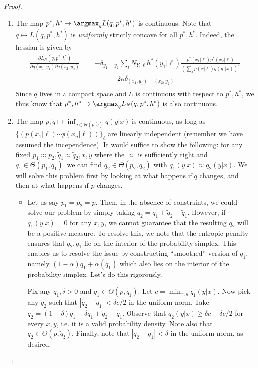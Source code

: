 \begin{proof}
\begin{enumerate}
\item The map $p^*,h^* \mapsto \argmax_q L(q,p^*,h^*)$ is continuous.  Note that $q\mapsto L(q,p^*,h^*)$
is \emph{uniformly} strictly concave for all $p^*,h^*$.  Indeed, the hessian is given by
%
\begin{align*}
\frac{\partial L_N(q,p^*,h^*)}{\partial q(x_1,y_1) \partial q(x_2,y_2)} =& 
    - \delta_{y_1=y_2}\sum_\ell N_{Y,\ell} h^*(y_1|\ell) 
              \frac{p^*(x_1|\ell)p^*(x_2|\ell)}{\left(\sum_x p(x|\ell) q(y_1|x)\right)^2} \\
    & \qquad - 2\kappa \delta_{(x_1,y_1)=(x_2,y_2)} \\
\end{align*}
%
Since $q$ lives in a compact space and $L$ is continuous with respect to $p^*,h^*$, we thus 
know that $p^*,h^* \mapsto \argmax_q L_N(q,p^*,h^*)$ is also continuous.  
\item The map $p,\tilde q \mapsto \inf_{q\in\Theta(p,\tilde q)} q(y|x)$ is continuous, as long as 
$\{(p(x_1|\ell)\cdots p(x_n|\ell))\}_\ell$ are linearly independent (remember we have assumed the independence). 
It would suffice to show the following: 
for any fixed $p_1 \approx p_2,\tilde q_1 \approx \tilde q_2,x,y$ where the $\approx$ is sufficiently tight
and $q_1\in \Theta(p_1,\tilde q_1)$, 
we can find $q_2\in \Theta(p_2,\tilde q_2)$ with $q_1(y|x)\approx q_2(y|x)$.  We will solve
this problem first by looking at what happens if $\tilde q$ changes, and then at what happens if $p$ changes.
\begin{itemize}
\item Let us say $p_1=p_2=p$.  Then, in the absence of constraints, we could solve
our problem by simply taking $q_2 = q_1 + \tilde q_2 - \tilde q_1$.
However, if $q_1(y|x)=0$ for any $x,y$, we cannot guarantee that the resulting $q_2$ will be a positive measure. 
To resolve this, we note that the entropic penalty ensures that $\tilde q_2,\tilde q_1$ lie on the interior
of the probability simplex.  This enables us to resolve the issue by constructing ``smoothed'' version of $q_1$, namely
$(1-\alpha) q_1 + \alpha (\tilde q_1)$ which also lies on the interior of the probability simplex.   Let's do this
rigorously.

Fix any $\tilde q_1,\delta>0$ and $q_1 \in \Theta(p,\tilde q_1)$. Let $c = \min_{x,y} \tilde q_1(y|x)$.  Now pick any $\tilde q_2$ such that $|\tilde q_2-\tilde q_1|< \delta c/2$ in the uniform norm.  Take $q_2 = (1-\delta)q_1 + \delta \tilde q_1 + \tilde q_2 - \tilde q_1$.  Observe that $q_2 (y|x) \geq \delta c - \delta c/2$ for every $x,y$, i.e. it is a valid
probability density.  Note also that $q_2 \in \Theta(p, \tilde q_2)$.  Finally, note that $|q_2 - q_1|<\delta$ in
the uniform norm, as desired. 


\end{itemize}
\end{enumerate}
\end{proof}
